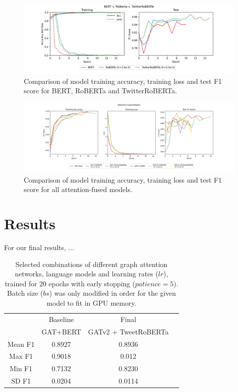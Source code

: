 \documentclass[letterpaper]{article} %
\begin{document}
\begin{figure}
    \includegraphics[width=\linewidth]{all_berts.png}
    \caption{Comparison of model training accuracy, training loss and test F1 score for BERT, RoBERTa and TwitterRoBERTa.}
\end{figure}

\begin{figure}
    \includegraphics[width=\linewidth]{all_joint.png}
    \caption{Comparison of model training accuracy, training loss and test F1 score for all attention-fused models.}
\end{figure}

\section{Results}

For our final results, ... 

\begin{table}
    \begin{tabular}{|c||c|c|c|}
        \hline
        \hline 
         & Baseline & Final  \\
         & GAT+BERT & GATv2 + TweetRoBERTa  \\
        \hline
        Mean F1  & 0.8927 & 0.8936  \\
        Max F1 & 0.9018& 0.012 \\
        Min F1 & 0.7132 & 0.8230 \\
        SD F1 & 0.0204 & 0.0114   \\
        \hline
    \end{tabular}
    \caption{Selected combinations of different graph attention networks, language models and learning rates ($lr$), trained for 20 epochs with early stopping ($patience=5$). Batch size ($bs$) was only modified in order for the given model to fit in GPU memory.}
\end{table}
\end{document}
